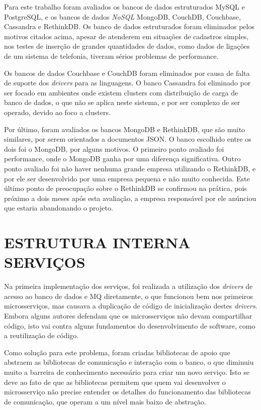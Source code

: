 Para este trabalho foram avaliados os bancos de dados estruturados MySQL e
PostgreSQL, e os bancos de dados \emph{NoSQL} MongoDB, CouchDB, Couchbase,
Cassandra e RethinkDB. Os banco de dados estruturados foram eliminados
pelos motivos citados acima, apesar de atenderem em situações de cadastros
simples, nos testes de inserção de grandes quantidades de dados, como
dados de ligações de um sistema de telefonia, tiveram sérios problemas de
performance.

Os bancos de dados Couchbase e CouchDB foram eliminados por causa de falta
de suporte dos \emph{drivers} para as linguagens. O banco Cassandra foi
eliminado por ser focado em ambientes onde existem clusters com distribuição
de carga de banco de dados, o que não se aplica neste sistema, e por
ser complexo de ser operado, devido ao foco a clusters.

Por último, foram avaliados os bancos MongoDB e RethinkDB, que são muito
similares, por serem orientados a documentos \ac{JSON}. O banco escolhido
entre os dois foi o MongoDB, por alguns motivos. O primeiro ponto avaliado
foi performance, onde o MongoDB ganha por uma diferença significativa. Outro
ponto avaliado foi não haver nenhuma grande empresa utilizando o RethinkDB, e
por ele ser desenvolvido por uma empresa pequena e não muito conhecida.
Este último ponto de preocupação sobre o RethinkDB se confirmou na prática,
pois próximo a dois meses após esta avaliação, a empresa responsável por ele
anúnciou que estaria abandonando o projeto.

\section{ESTRUTURA INTERNA SERVIÇOS}

Na primeira implementação dos serviços, foi realizada a utilização dos
\emph{drivers} de acesso ao banco de dados e \ac{MQ} diretamente, o que
funcionou bem nos primeiros microsserviços, mas causava a duplicação de código de
inicialização destes \emph{drivers}. Embora alguns autores defendam que
os microsserviços não devam compartilhar código, isto vai contra alguns
fundamentos do desenvolvimento de software, como a reutilização de código.

Como solução para este problema, foram criadas bibliotecas de apoio que
abstraem as bibliotecas de comunicação e interação com o banco, o que
diminuiu muito a barreira de conhecimento necessário para criar um novo
serviço. Isto se deve ao fato de que as bibliotecas permitem que quem vai
desenvolver o microsserviço não precise entender os detalhes do funcionamento das
bibliotecas de comunicação, que operam a um nível mais baixo de abstração.

